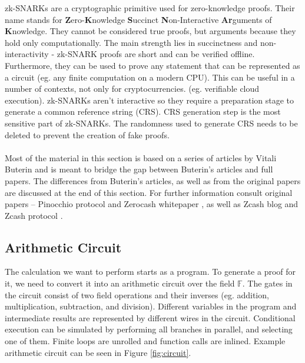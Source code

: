 zk-SNARKs are a cryptographic primitive used for zero-knowledge proofs. Their name stands for \textbf{Z}ero-\textbf{K}nowledge \textbf{S}uccinct \textbf{N}on-Interactive \textbf{Ar}guments of \textbf{K}nowledge. They cannot be considered true proofs, but arguments because they hold only computationally. The main strength lies in succinctness and non-interactivity - zk-SNARK proofs are short and can be verified offline. Furthermore, they can be used to prove any statement that can be represented as a circuit (eg. any finite computation on a modern CPU). This can be useful in a number of contexts, not only for cryptocurrencies. (eg. verifiable cloud execution). zk-SNARKs aren't interactive so they require a preparation stage to generate a common reference string (CRS). CRS generation step is the most sensitive part of zk-SNARKs. The randomness used to generate CRS needs to be deleted to prevent the creation of fake proofs.\\
\\
Most of the material in this section is based on a series of articles by Vitali Buterin \cite{buterin1, buterin2, buterin3} and is meant to bridge the gap between Buterin's articles and full papers. The differences from Buterin's articles, as well as from the original papers are discussed at the end of this section. For further information consult original papers -- Pinocchio protocol\cite{parno2013pinocchio} and Zerocash whitepaper \cite{sasson2014zerocash}, as well as Zcash blog \cite{zcashzksnarks} and Zcash protocol \cite{zcashprotocol}. %

\subsection{Arithmetic Circuit}

The calculation we want to perform starts as a program. To generate a proof for it, we need to convert it into an arithmetic circuit over the field $\mathbb{F}$. The gates in the circuit consist of two field operations and their inverses (eg. addition, multiplication, subtraction, and division). Different variables in the program and intermediate results are represented by different wires in the circuit. Conditional execution can be simulated by performing all branches in parallel, and selecting one of them. Finite loops are unrolled and function calls are inlined. Example arithmetic circuit can be seen in Figure \ref{fig:circuit}.

